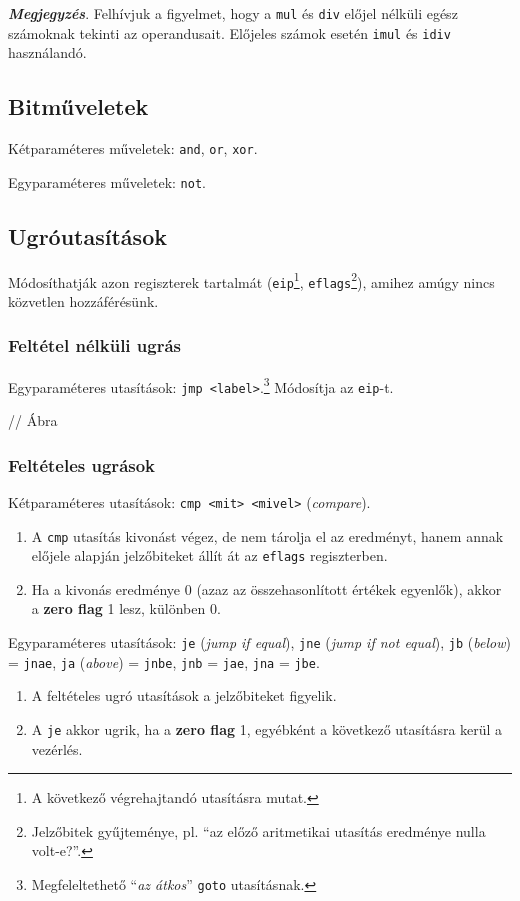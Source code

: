 \textbf{\textit{Megjegyzés}}. Felhívjuk a figyelmet, hogy a \texttt{mul} és \texttt{div} előjel nélküli egész számoknak tekinti az operandusait. Előjeles számok esetén \texttt{imul} és \texttt{idiv} használandó.

\subsection{Bitműveletek}

Kétparaméteres műveletek: \texttt{and}, \texttt{or}, \texttt{xor}.

Egyparaméteres műveletek: \texttt{not}.

\subsection{Ugróutasítások}

Módosíthatják azon regiszterek tartalmát (\texttt{eip}\footnote{A következő végrehajtandó utasításra mutat.}, \texttt{eflags}\footnote{Jelzőbitek gyűjteménye, pl. ``az előző aritmetikai utasítás eredménye nulla volt-e?''.}), amihez amúgy nincs közvetlen hozzáférésünk.

\subsubsection{Feltétel nélküli ugrás}

Egyparaméteres utasítások: \texttt{jmp <label>}.\footnote{Megfeleltethető ``\textit{az átkos}'' \texttt{goto} utasításnak.} Módosítja az \texttt{eip}-t.%

// Ábra

\subsubsection{Feltételes ugrások}

Kétparaméteres utasítások: \texttt{cmp <mit> <mivel>} (\textit{compare}).
\begin{enumerate}
	\item A \texttt{cmp} utasítás kivonást végez, de nem tárolja el az eredményt, hanem annak előjele alapján jelzőbiteket állít át az \texttt{eflags} regiszterben.
	\item Ha a kivonás eredménye 0 (azaz az összehasonlított értékek egyenlők), akkor a \textbf{zero flag} 1 lesz, különben 0.
\end{enumerate}

Egyparaméteres utasítások: \texttt{je} (\textit{jump if equal}), \texttt{jne} (\textit{jump if not equal}), \texttt{jb} (\textit{below}) = \texttt{jnae}, \texttt{ja} (\textit{above}) = \texttt{jnbe}, \texttt{jnb} = \texttt{jae}, \texttt{jna} = \texttt{jbe}. 
\begin{enumerate}
	\item A feltételes ugró utasítások a jelzőbiteket figyelik.
	\item A \texttt{je} akkor ugrik, ha a \textbf{zero flag} 1, egyébként a következő utasításra kerül a vezérlés.
\end{enumerate}


